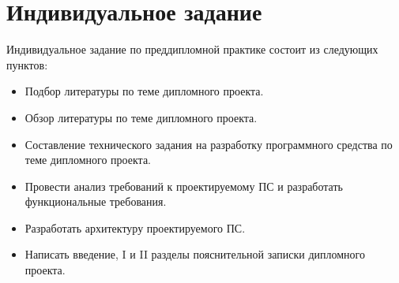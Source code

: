 \section{Индивидуальное задание}
\label{sec:practice:individual_task}
Индивидуальное задание по преддипломной практике состоит из следующих пунктов:
\begin{itemize}
  \item Подбор литературы по теме дипломного проекта.
  \item Обзор литературы по теме дипломного проекта.
  \item Составление технического задания на разработку программного средства по теме дипломного проекта.
  \item Провести анализ требований к проектируемому ПС и разработать функциональные требования.
  \item Разработать архитектуру проектируемого ПС.
  \item Написать введение, I и II разделы пояснительной записки дипломного проекта.
\end{itemize}
